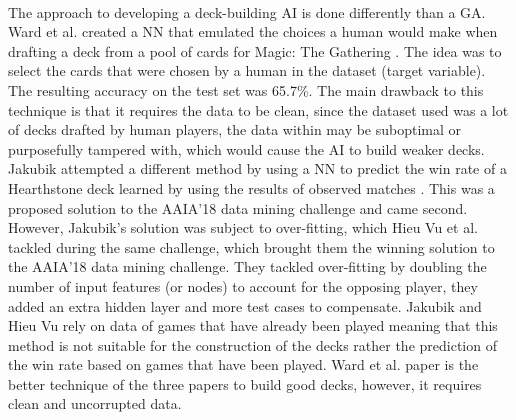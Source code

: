 \documentclass{report} %
\begin{document}
\\
\indent The approach to developing a deck-building AI is done differently than a GA. Ward et al. created a NN that emulated the choices a human would make when drafting a deck from a pool of cards for Magic: The Gathering \cite{Ward2020}. The idea was to select the cards that were chosen by a human in the dataset (target variable). The resulting accuracy on the test set was 65.7\%. The main drawback to this technique is that it requires the data to be clean, since the dataset used was a lot of decks drafted by human players, the data within may be suboptimal or purposefully tampered with, which would cause the AI to build weaker decks. \\
\indent Jakubik attempted a different method by using a NN to predict the win rate of a Hearthstone deck learned by using the results of observed matches \cite{NNWRPrediction}. This was a proposed solution to the AAIA’18 data mining challenge and came second. However, Jakubik's solution was subject to over-fitting, which Hieu Vu et al. tackled during the same challenge, which brought them the winning solution to the AAIA’18 data mining challenge\cite{PredictWR}. They tackled over-fitting by doubling the number of input features (or nodes) to account for the opposing player, they added an extra hidden layer and more test cases to compensate. Jakubik \cite{NNWRPrediction} and Hieu Vu \cite{PredictWR} rely on data of games that have already been played meaning that this method is not suitable for the construction of the decks rather the prediction of the win rate based on games that have been played. Ward et al. paper is the better technique of the three papers to build good decks, however, it requires clean and uncorrupted data.
 
\end{document}
